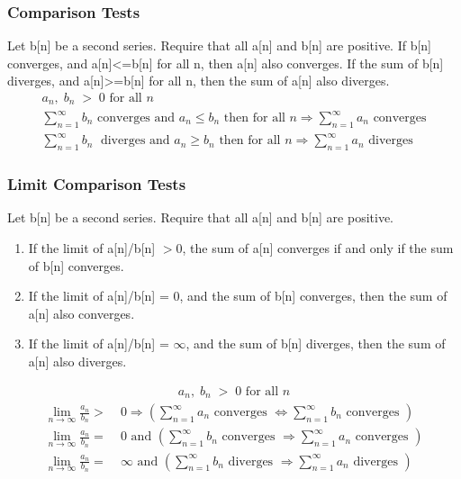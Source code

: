 \documentclass{article}
\begin{document}
        \subsubsection{Comparison Tests}
        Let b[n] be a second series. Require that all a[n] and b[n] are positive. If b[n] converges, and a[n]<=b[n] for all n, then a[n] also converges. If the sum of b[n] diverges, and a[n]>=b[n] for all n, then the sum of a[n] also diverges.
            \begin{gather*}
                a_n,\;b_n\;>\;0\text{ for all }n\\[6pt]
                \sum^{\infty}_{n=1} b_n \text{ converges and } a_n \leq b_n \text{ then for all } n\Rightarrow\sum^{\infty}_{n=1} a_n\text{ converges}\\[6pt]
                \sum^{\infty}_{n=1} b_n \;\text{ diverges and } a_n \geq b_n \text{ then for all } n\Rightarrow\sum^{\infty}_{n=1} a_n\text{ diverges}
            \end{gather*}
            
        \subsubsection{Limit Comparison Tests}
        Let b[n] be a second series. Require that all a[n] and b[n] are positive.
        \begin{enumerate}
            \item If the limit of a[n]/b[n] $>0$, the sum of a[n] converges if and only if the sum of b[n] converges.
            \item If the limit of a[n]/b[n] = 0, and the sum of b[n] converges, then the sum of a[n] also converges.
            \item If the limit of a[n]/b[n] = $\infty$, and the sum of b[n] diverges, then the sum of a[n] also diverges.
        \end{enumerate}
            \begin{align*}
                a_n,\;b_n\;>\;0\text{ for all }n
            \end{align*}
            \begin{align*}
                \lim_{n\rightarrow \infty}\frac{a_n}{b_n}> & \;0\Rightarrow\left(\sum^{\infty}_{n=1} a_n \text{ converges } \Longleftrightarrow \sum^{\infty}_{n=1} b_n \text{ converges }\right)\\[6pt]
                \lim_{n\rightarrow \infty}\frac{a_n}{b_n}= & \;0\text{ and }\left(\sum^{\infty}_{n=1} b_n \text{ converges } \Rightarrow \sum^{\infty}_{n=1} a_n \text{ converges }\right)\\[6pt]
                \lim_{n\rightarrow \infty}\frac{a_n}{b_n}= & \;\infty\text{ and }\left(\sum^{\infty}_{n=1} b_n \text{ diverges } \Rightarrow \sum^{\infty}_{n=1} a_n \text{ diverges }\right)
            \end{align*}
            
\end{document}
